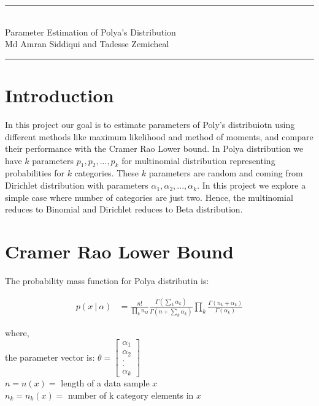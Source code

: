 \documentclass{article} %
\newcommand{\?}{\stackrel{?}{=}}
\newcommand{\horrule}[1]{\rule{\linewidth}{#1}} %
\begin{document}
\begin{center}
\horrule{0.5pt} \\[0.4cm] %
\LARGE Parameter Estimation of Polya's Distribution\\
\vspace{5pt}
\large Md Amran Siddiqui \normalsize and \large Tadesse Zemicheal\\
\vspace{5pt}
\horrule{2pt} %
\end{center}



\section{Introduction} \label{INTRO}
In this project our goal is to estimate parameters of Poly's distribuiotn using different methods like maximum likelihood and method of moments, and compare their performance with the Cramer Rao Lower bound. In Polya distribution we have $k$ parameters $p_1, p_2, ..., p_k$ for multinomial distribution representing probabilities for $k$ categories. These $k$ parameters are random and coming from Dirichlet distribution with parameters $\alpha_1, \alpha_2, ..., \alpha_k$. In this project we explore a simple case where number of categories are just two. Hence, the multinomial reduces to Binomial and Dirichlet reduces to Beta distribution.

\section{Cramer Rao Lower Bound}\label{CRLB}
The probability mass function for Polya distributin is:

\begin{align}
p(x\ |\ \alpha) &=  
\frac{n!}{\prod\limits_{k} n_{k!}}
\frac{\Gamma(\sum\limits_{k}\alpha_k)}{\Gamma(n+\sum\limits_{k}\alpha_k)}
\prod\limits_{k}\frac{\Gamma(n_{k} + \alpha_k)} {\Gamma(\alpha_k)}\label{pdf}
\end{align}

where,\\
the parameter vector is:
$\theta=\left[\begin{matrix}
\alpha_1\\
\alpha_2\\
.\\
.\\
\alpha_k
\end{matrix}\right]$\\
$n = n(x) = $ length of a data sample $x$\\
$n_{k} = n_k(x) = $ number of k category elements in $x$\\
\end{document}
